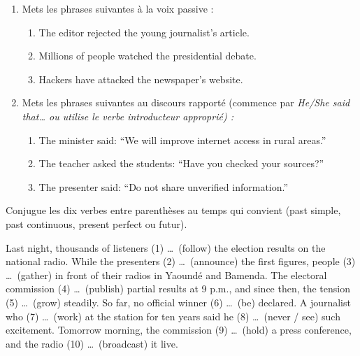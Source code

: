 \documentclass[11pt]{article}
\newcommand{\eng}[1]{\ifmmode\text{\textit{#1}}\else\begingroup\selectlanguage{english}\itshape #1\endgroup\fi}
\begin{document}
\begin{exercice}
\begin{enumerate}
\item Mets les phrases suivantes à la voix passive :
\begin{enumerate}
\item[a)] The editor rejected the young journalist's article.
\item[b)] Millions of people watched the presidential debate.
\item[c)] Hackers have attacked the newspaper's website.
\end{enumerate}
\item Mets les phrases suivantes au discours rapporté (commence par \eng{He/She said that\ldots} ou utilise le verbe introducteur approprié) :
\begin{enumerate}
\item[a)] The minister said: “We will improve internet access in rural areas.”
\item[b)] The teacher asked the students: “Have you checked your sources?”
\item[c)] The presenter said: “Do not share unverified information.”
\end{enumerate}
\end{enumerate}
\end{exercice}

\begin{exercice}
Conjugue les dix verbes entre parenthèses au temps qui convient (past simple, past continuous, present perfect ou futur).
\begin{textebox}
Last night, thousands of listeners (1) \ldots\ (follow) the election results on the national radio. While the presenters (2) \ldots\ (announce) the first figures, people (3) \ldots\ (gather) in front of their radios in Yaoundé and Bamenda. The electoral commission (4) \ldots\ (publish) partial results at 9 p.m., and since then, the tension (5) \ldots\ (grow) steadily. So far, no official winner (6) \ldots\ (be) declared. A journalist who (7) \ldots\ (work) at the station for ten years said he (8) \ldots\ (never / see) such excitement. Tomorrow morning, the commission (9) \ldots\ (hold) a press conference, and the radio (10) \ldots\ (broadcast) it live.
\end{textebox}
\end{exercice}
\end{document}
